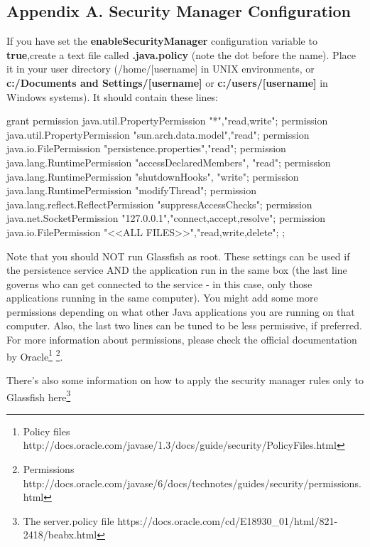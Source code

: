 \documentclass[a4paper]{article}
\begin{document}
		\begin{appendices}
			\appendix
			\section{Appendix A. Security Manager Configuration} \label{app:AppendixA}
			If you have set the \textbf{enableSecurityManager} configuration variable to \textbf{true},create a text file called \textbf{.java.policy} (note the dot before the name). Place it in your user directory (/home/[username] in UNIX environments, or \textbf{c:/Documents and Settings/[username]} or \textbf{c:/users/[username]} in Windows systems). It should contain these lines:
			
			\begin{verbbox}
				grant {
					permission java.util.PropertyPermission "*","read,write";
					permission java.util.PropertyPermission "sun.arch.data.model","read";
					permission java.io.FilePermission "persistence.properties","read";
					permission java.lang.RuntimePermission "accessDeclaredMembers", "read";
					permission java.lang.RuntimePermission "shutdownHooks", "write";
					permission java.lang.RuntimePermission "modifyThread";
					permission java.lang.reflect.ReflectPermission "suppressAccessChecks";
					permission java.net.SocketPermission "127.0.0.1","connect,accept,resolve";
					permission java.io.FilePermission "<<ALL FILES>>","read,write,delete";
				};
			\end{verbbox}
			\begin{figure}[ht]
				\centering	
				\theverbbox
			\end{figure}
			Note that you should NOT run Glassfish as root. These settings can be used if the persistence service AND the application run in the same box (the last line governs who can get connected to the service - in this case, only those applications running in the same computer). You might add some more permissions depending on what other Java applications you are running on that computer. Also, the last two lines can be tuned to be less permissive, if preferred. For more information about permissions, please check the official documentation by Oracle\footnote{Policy files http://docs.oracle.com/javase/1.3/docs/guide/security/PolicyFiles.html} \footnote{Permissions http://docs.oracle.com/javase/6/docs/technotes/guides/security/permissions.html}.
			
			There's also some information on how to apply the security manager rules only to Glassfish here\footnote{The server.policy file https://docs.oracle.com/cd/E18930\_01/html/821-2418/beabx.html}
			

\end{appendices}
\end{document}
